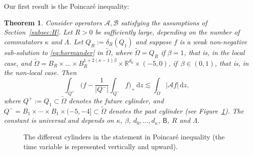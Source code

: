 \documentclass[JEP,XML,SOM,Unicode,NoFloatCountersInSection,published]{cedram}
\newtheorem{theorem}{Theorem}
\theoremstyle{definition}
\newcommand\R{{\mathbb R}}
\newcommand{\cA}{{\mathcal A}}
\newcommand{\cB}{{\mathcal B}}
\newcommand{\sB}{{\mathsf B}}
\newcommand{\dd}{{\, \mathrm d}}
\begin{document}
Our first result is the Poincaré inequality:
\begin{theorem}
\label{thm:poincare}
Consider operators $\cA, \cB$ satisfying the assumptions of Section~\ref{subsec:H}. Let $R >0$ be sufficiently large, depending on the
number of commutators $\kappa$ and $\Lambda$. Let \(Q_R :=\delta_R\left(Q_1\right)\)
and suppose $f$ is a weak non-negative sub-solution to
\eqref{eq:hormander} in $\tilde \Omega$, where $\tilde \Omega \!=\! Q_R$ if $\beta \!=\! 1$, that is, in the local case, and \(\tilde \Omega \!=\! B_R\!\times\! \dots \!\times\! B_R^{1 + 2(\kappa-1)\beta} \!\times\! \R^{d_0} \!\times\! (-5,0)\), if~$\beta \in (0, 1)$, that is, in the non-local case. Then
\begin{equation}
\label{eq:poincare}
\int_{Q^+} \biggl(f - \frac{1}{|Q^-|} \int_{Q^-}
f \biggr)_+ \dd z \lesssim
\int_{\tilde \Omega} \big\vert \cA f\big\vert \dd z,
\end{equation}
where $Q^+ \!:=\! Q_1 \!\subset\! \tilde \Omega$ denotes the future cylinder,
and
$Q^-\!=\!B_1 \!\times\! \cdots \!\times\! B_1\! \times (-5,-4] \!\subset\!
\tilde\Omega$ denotes the past cylinder (see
Figure~\ref{fig:main-result}).
The constant is universal and
depends on $\kappa$, $\beta$, $d_0,\dots,d_\kappa$, $\sB$, $R$
and $\Lambda$.
\end{theorem}

\begin{figure}[htb]
\centering


\caption{The different cylinders in the statement in Poincaré
inequality (the time variable is represented vertically and
upward).}\label{fig:main-result}
\end{figure}
\end{document}
